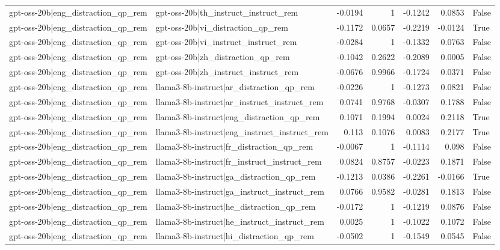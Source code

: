 \begin{table}
\begin{tabular}{l l r r r r l}
gpt-oss-20b|eng_distraction_qp_rem & gpt-oss-20b|th_instruct_instruct_rem & -0.0194 & 1 & -0.1242 & 0.0853 & False \\
gpt-oss-20b|eng_distraction_qp_rem & gpt-oss-20b|vi_distraction_qp_rem & -0.1172 & 0.0657 & -0.2219 & -0.0124 & True \\
gpt-oss-20b|eng_distraction_qp_rem & gpt-oss-20b|vi_instruct_instruct_rem & -0.0284 & 1 & -0.1332 & 0.0763 & False \\
gpt-oss-20b|eng_distraction_qp_rem & gpt-oss-20b|zh_distraction_qp_rem & -0.1042 & 0.2622 & -0.2089 & 0.0005 & False \\
gpt-oss-20b|eng_distraction_qp_rem & gpt-oss-20b|zh_instruct_instruct_rem & -0.0676 & 0.9966 & -0.1724 & 0.0371 & False \\
gpt-oss-20b|eng_distraction_qp_rem & llama3-8b-instruct|ar_distraction_qp_rem & -0.0226 & 1 & -0.1273 & 0.0821 & False \\
gpt-oss-20b|eng_distraction_qp_rem & llama3-8b-instruct|ar_instruct_instruct_rem & 0.0741 & 0.9768 & -0.0307 & 0.1788 & False \\
gpt-oss-20b|eng_distraction_qp_rem & llama3-8b-instruct|eng_distraction_qp_rem & 0.1071 & 0.1994 & 0.0024 & 0.2118 & True \\
gpt-oss-20b|eng_distraction_qp_rem & llama3-8b-instruct|eng_instruct_instruct_rem & 0.113 & 0.1076 & 0.0083 & 0.2177 & True \\
gpt-oss-20b|eng_distraction_qp_rem & llama3-8b-instruct|fr_distraction_qp_rem & -0.0067 & 1 & -0.1114 & 0.098 & False \\
gpt-oss-20b|eng_distraction_qp_rem & llama3-8b-instruct|fr_instruct_instruct_rem & 0.0824 & 0.8757 & -0.0223 & 0.1871 & False \\
gpt-oss-20b|eng_distraction_qp_rem & llama3-8b-instruct|ga_distraction_qp_rem & -0.1213 & 0.0386 & -0.2261 & -0.0166 & True \\
gpt-oss-20b|eng_distraction_qp_rem & llama3-8b-instruct|ga_instruct_instruct_rem & 0.0766 & 0.9582 & -0.0281 & 0.1813 & False \\
gpt-oss-20b|eng_distraction_qp_rem & llama3-8b-instruct|he_distraction_qp_rem & -0.0172 & 1 & -0.1219 & 0.0876 & False \\
gpt-oss-20b|eng_distraction_qp_rem & llama3-8b-instruct|he_instruct_instruct_rem & 0.0025 & 1 & -0.1022 & 0.1072 & False \\
gpt-oss-20b|eng_distraction_qp_rem & llama3-8b-instruct|hi_distraction_qp_rem & -0.0502 & 1 & -0.1549 & 0.0545 & False \\

\end{tabular}
\end{table}
